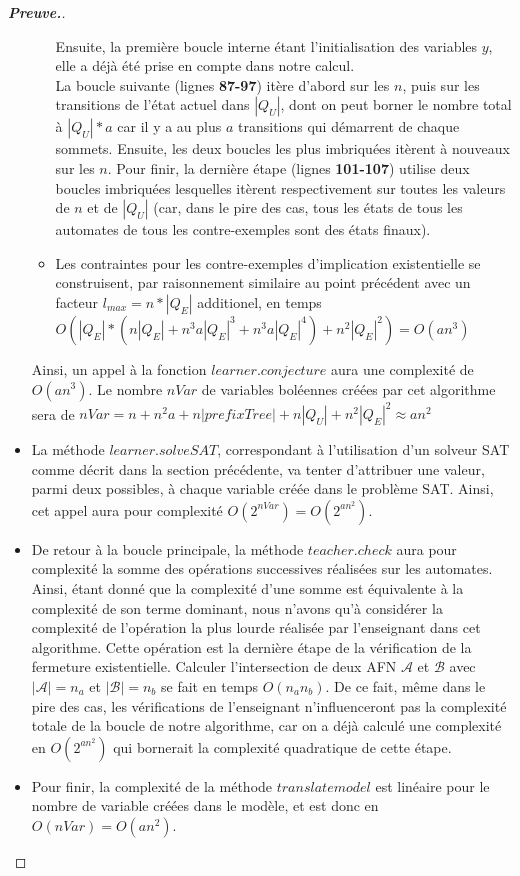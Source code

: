 \documentclass[12pt,a4paper,oneside,titlepage]{report}
\newenvironment{demonstration}{\begin{proof}[\textnormal{\textbf{Preuve.}}]}{\end{proof}}
\begin{document}
\begin{demonstration}
\begin{itemize}
\begin{itemize}
Ensuite, la première boucle interne étant l'initialisation des variables $y$, elle a déjà été prise en compte dans notre calcul.\\
La boucle suivante (lignes \textbf{87-97}) itère d'abord sur les $n$, puis sur les transitions de l'état actuel dans $|Q_U|$, dont on peut borner le nombre total à $|Q_U|*a$ car il y a au plus $a$ transitions qui démarrent de chaque sommets. Ensuite, les deux boucles les plus imbriquées itèrent à nouveaux sur les $n$. Pour finir, la dernière étape (lignes \textbf{101-107})  utilise deux boucles imbriquées lesquelles itèrent respectivement sur toutes les valeurs de $n$ et de $|Q_U|$ (car, dans le pire des cas, tous les états de tous les automates de tous les contre-exemples sont des états finaux).
\item Les contraintes pour les contre-exemples d'implication existentielle se construisent, par raisonnement similaire au point précédent avec un facteur $l_{max}=n*|Q_E|$ additionel, en temps $O(|Q_E|*(n|Q_E|+n^3a|Q_E|^3+n^3a|Q_E|^4)+n^2|Q_E|^2)=O(an^3)$
\end{itemize}
Ainsi, un appel à la fonction $learner.conjecture$ aura une complexité de $O(an^3)$. Le nombre $nVar$ de variables boléennes créées par cet algorithme sera de $nVar=n+n^2a+n|prefixTree|+n|Q_U|+n^2|Q_E|^2\approx an^2$
\item La méthode $learner.solveSAT$, correspondant à l'utilisation d'un solveur SAT comme décrit dans la section précédente, va tenter d'attribuer une valeur, parmi deux possibles, à chaque variable créée dans le problème SAT. Ainsi, cet appel aura pour complexité $O(2^{ nVar})=O(2^{an^2})$.
\item De retour à la boucle principale, la méthode $teacher.check$ aura pour complexité la somme des opérations successives réalisées sur les automates. Ainsi, étant donné que la complexité d'une somme est équivalente à la complexité de son terme dominant, nous n'avons qu'à considérer la complexité de l'opération la plus lourde réalisée par l'enseignant dans cet algorithme. Cette opération est la dernière étape de la vérification de la fermeture existentielle. Calculer l'intersection de deux AFN $\mathcal{A}$ et $\mathcal{B}$ avec $|\mathcal{A}|=n_a$ et $|\mathcal{B}|=n_b$ se fait en temps $O(n_an_b)$. De ce fait, même dans le pire des cas, les vérifications de l'enseignant n'influenceront pas la complexité totale de la boucle de notre algorithme, car on a déjà calculé une complexité en $O(2^{an^2})$ qui bornerait la complexité quadratique de cette étape.
\item Pour finir, la complexité de la méthode $translatemodel$ est linéaire pour le nombre de variable créées dans le modèle, et est donc en $O(nVar)=O(an^2)$.

\end{itemize}
\end{demonstration}
\end{document}
